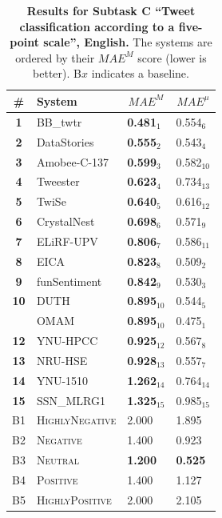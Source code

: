 \begin{table}[h!]
\centering
\begin{small}
\renewcommand{\arraystretch}{1.0}%
\begin{tabular}{|c|l|l|l|}
\hline
      \bf \# & \bf System & \multicolumn{1}{c|}{$MAE^M$} & \multicolumn{1}{c|}{$MAE^{\mu}$} \\
\hline
\bf 1 & BB\_twtr & \bf 0.481$_{1}$ & 0.554$_{6}$ \\
\bf 2 & DataStories & \bf 0.555$_{2}$ & 0.543$_{4}$ \\
\bf 3 & Amobee-C-137 & \bf 0.599$_{3}$ & 0.582$_{10}$ \\
\bf 4 & Tweester & \bf 0.623$_{4}$ & 0.734$_{13}$ \\
\bf 5 & TwiSe & \bf 0.640$_{5}$ & 0.616$_{12}$ \\
\bf 6 & CrystalNest & \bf 0.698$_{6}$ & 0.571$_{9}$ \\
\bf 7 & ELiRF-UPV & \bf 0.806$_{7}$ & 0.586$_{11}$ \\
\bf 8 & EICA & \bf 0.823$_{8}$ & 0.509$_{2}$ \\
\bf 9 & funSentiment & \bf 0.842$_{9}$ & 0.530$_{3}$ \\
\bf 10 & DUTH & \bf 0.895$_{10}$ & 0.544$_{5}$ \\
& OMAM & \bf 0.895$_{10}$ & 0.475$_{1}$ \\
\bf 12 & YNU-HPCC & \bf 0.925$_{12}$ & 0.567$_{8}$ \\
\bf 13 & NRU-HSE & \bf 0.928$_{13}$ & 0.557$_{7}$ \\
\bf 14 & YNU-1510 & \bf 1.262$_{14}$ & 0.764$_{14}$ \\
\bf 15 & SSN\_MLRG1 & \bf 1.325$_{15}$ & 0.985$_{15}$ \\
\hline
B1 &  \textsc{HighlyNegative} & 2.000 & 1.895\\
B2 & \textsc{Negative} & 1.400 & 0.923\\
B3 & \textsc{Neutral} & \bf 1.200 & \bf 0.525\\
B4 & \textsc{Positive} & 1.400 & 1.127\\
B5 & \textsc{HighlyPositive} & 2.000 & 2.105\\
\hline
\end{tabular}
\caption{\textbf{Results for Subtask C ``Tweet classification according to a five-point scale'', English.} The systems are ordered by their $MAE^{M}$ score (lower is better). B$x$ indicates a baseline.}
\label{table:ResultsSubtaskC:English}
\end{small}
\end{table}
